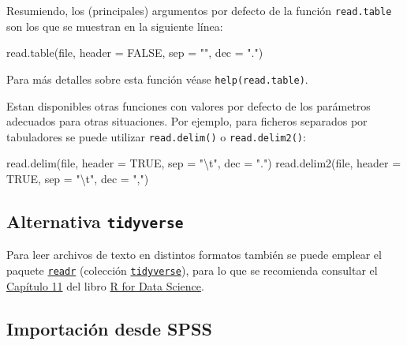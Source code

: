 \documentclass[
]{book}
\newenvironment{Shaded}{\begin{snugshade}}{\end{snugshade}}
\newcommand{\AttributeTok}[1]{\textcolor[rgb]{0.77,0.63,0.00}{#1}}
\newcommand{\ConstantTok}[1]{\textcolor[rgb]{0.00,0.00,0.00}{#1}}
\newcommand{\FunctionTok}[1]{\textcolor[rgb]{0.00,0.00,0.00}{#1}}
\newcommand{\NormalTok}[1]{#1}
\newcommand{\SpecialCharTok}[1]{\textcolor[rgb]{0.00,0.00,0.00}{#1}}
\newcommand{\StringTok}[1]{\textcolor[rgb]{0.31,0.60,0.02}{#1}}
\theoremstyle{break}
\begin{document}
Resumiendo, los (principales) argumentos por defecto de la función
\texttt{read.table} son los que se muestran en la siguiente línea:

\begin{Shaded}
\begin{Highlighting}[]
\FunctionTok{read.table}\NormalTok{(file, }\AttributeTok{header =} \ConstantTok{FALSE}\NormalTok{, }\AttributeTok{sep =} \StringTok{""}\NormalTok{, }\AttributeTok{dec =} \StringTok{"."}\NormalTok{)  }
\end{Highlighting}
\end{Shaded}

Para más detalles sobre esta función véase
\texttt{help(read.table)}.

Estan disponibles otras funciones con valores por defecto de los parámetros
adecuados para otras situaciones. Por ejemplo, para ficheros separados por tabuladores
se puede utilizar \texttt{read.delim()} o \texttt{read.delim2()}:

\begin{Shaded}
\begin{Highlighting}[]
\FunctionTok{read.delim}\NormalTok{(file, }\AttributeTok{header =} \ConstantTok{TRUE}\NormalTok{, }\AttributeTok{sep =} \StringTok{"}\SpecialCharTok{\textbackslash{}t}\StringTok{"}\NormalTok{, }\AttributeTok{dec =} \StringTok{"."}\NormalTok{)}
\FunctionTok{read.delim2}\NormalTok{(file, }\AttributeTok{header =} \ConstantTok{TRUE}\NormalTok{, }\AttributeTok{sep =} \StringTok{"}\SpecialCharTok{\textbackslash{}t}\StringTok{"}\NormalTok{, }\AttributeTok{dec =} \StringTok{","}\NormalTok{)}
\end{Highlighting}
\end{Shaded}

\hypertarget{alternativa-tidyverse}{%
\subsection{\texorpdfstring{Alternativa \texttt{tidyverse}}{Alternativa tidyverse}}\label{alternativa-tidyverse}}

Para leer archivos de texto en distintos formatos también se puede emplear el paquete \href{https://readr.tidyverse.org}{\texttt{readr}}
(colección \href{https://www.tidyverse.org/}{\texttt{tidyverse}}), para lo que se recomienda
consultar el \href{https://r4ds.had.co.nz/data-import.html}{Capítulo 11} del libro \href{http://r4ds.had.co.nz}{R for Data Science}.

\hypertarget{importaciuxf3n-desde-spss}{%
\subsection{Importación desde SPSS}\label{importaciuxf3n-desde-spss}}
\end{document}
